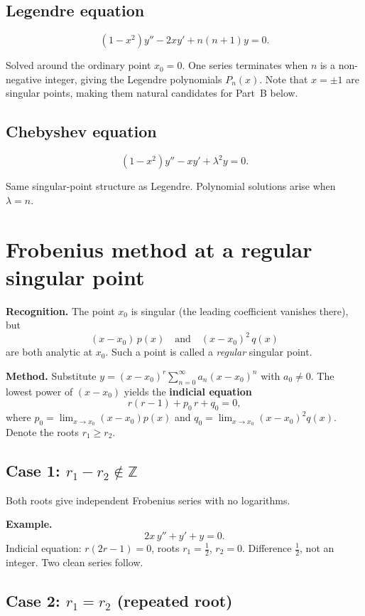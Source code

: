 \documentclass{essay}
\begin{document}
\subsection*{Legendre equation}

\[
  (1-x^2)y'' - 2xy' + n(n+1)y = 0.
\]

Solved around the ordinary point $x_0 = 0$.  One series terminates when $n$ is a non-negative integer, giving the Legendre polynomials $P_n(x)$.  Note that $x = \pm 1$ are singular points, making them natural candidates for Part~B below.

\subsection*{Chebyshev equation}

\[
  (1-x^2)y'' - xy' + \lambda^2 y = 0.
\]

Same singular-point structure as Legendre.  Polynomial solutions arise when $\lambda = n$.

\section{Frobenius method at a regular singular point}

\textbf{Recognition.}  The point $x_0$ is singular (the leading coefficient vanishes there), but
\[
  (x - x_0)\,p(x) \quad\text{and}\quad (x-x_0)^2\,q(x)
\]
are both analytic at $x_0$.  Such a point is called a \emph{regular} singular point.

\textbf{Method.}  Substitute $y = (x-x_0)^r \sum_{n=0}^{\infty} a_n (x-x_0)^n$ with $a_0 \neq 0$.  The lowest power of $(x-x_0)$ yields the \textbf{indicial equation}
\[
  r(r-1) + p_0\,r + q_0 = 0,
\]
where $p_0 = \lim_{x\to x_0}(x-x_0)p(x)$ and $q_0 = \lim_{x\to x_0}(x-x_0)^2 q(x)$.  Denote the roots $r_1 \geq r_2$.

\subsection*{Case 1: $r_1 - r_2 \notin \mathbb{Z}$}

Both roots give independent Frobenius series with no logarithms.

\textbf{Example.}
\[
  2x\,y'' + y' + y = 0.
\]
Indicial equation: $r(2r-1) = 0$, roots $r_1 = \tfrac{1}{2}$, $r_2 = 0$.  Difference $\tfrac{1}{2}$, not an integer.  Two clean series follow.

\subsection*{Case 2: $r_1 = r_2$ (repeated root)}
\end{document}

